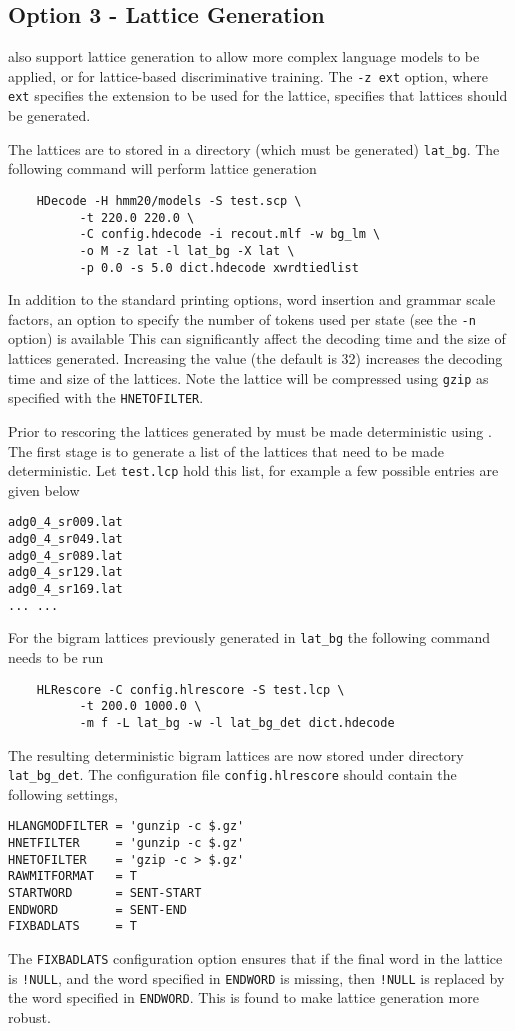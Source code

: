 \subsection{Option 3 - Lattice Generation}

 also support lattice generation to allow more complex language
models to be applied, or for lattice-based discriminative training. The
\texttt{-z ext} option, where \texttt{ext} specifies the extension to be used
for the lattice, specifies that lattices should be generated.

The lattices are to stored in a directory (which must be generated)
\texttt{lat\_bg}. The following command will perform lattice generation
\begin{verbatim}
    HDecode -H hmm20/models -S test.scp \
          -t 220.0 220.0 \
          -C config.hdecode -i recout.mlf -w bg_lm \
          -o M -z lat -l lat_bg -X lat \
          -p 0.0 -s 5.0 dict.hdecode xwrdtiedlist
\end{verbatim}

In addition to the standard printing options, word insertion and grammar scale
factors, an option to specify the number of tokens used per state (see the
\texttt{-n} option) is available This can significantly affect the decoding time and the
size of lattices generated. Increasing the value (the default is 32) increases
the decoding time and size of the lattices. Note the lattice will be
compressed using \texttt{gzip} as specified with the \texttt{HNETOFILTER}.

Prior to rescoring the
lattices generated by \htool{HDecode} must be made deterministic using
\htool{HLRescore}. The first stage is to generate a list of the lattices that
need to be made deterministic. Let \texttt{test.lcp} hold this
list, for example a few possible  entries are given below
\begin{verbatim}
adg0_4_sr009.lat
adg0_4_sr049.lat
adg0_4_sr089.lat
adg0_4_sr129.lat
adg0_4_sr169.lat
... ...

\end{verbatim}
For the bigram lattices previously generated in \texttt{lat\_bg} the following
command needs to be run
\begin{verbatim}
    HLRescore -C config.hlrescore -S test.lcp \
          -t 200.0 1000.0 \
          -m f -L lat_bg -w -l lat_bg_det dict.hdecode 
\end{verbatim}
The resulting deterministic bigram lattices are now stored under directory
\texttt{lat\_bg\_det}. The configuration file
\texttt{config.hlrescore} should contain the following
settings,
\begin{verbatim}
HLANGMODFILTER = 'gunzip -c $.gz'
HNETFILTER     = 'gunzip -c $.gz'
HNETOFILTER    = 'gzip -c > $.gz'
RAWMITFORMAT   = T
STARTWORD      = SENT-START
ENDWORD        = SENT-END
FIXBADLATS     = T 
\end{verbatim}
The \texttt{FIXBADLATS} configuration option ensures that if the final word in the lattice is
\texttt{!NULL}, and the word specified in \texttt{ENDWORD} is missing, then
\texttt{!NULL} is replaced by the word specified in \texttt{ENDWORD}.  This is
found to make lattice generation more robust.


